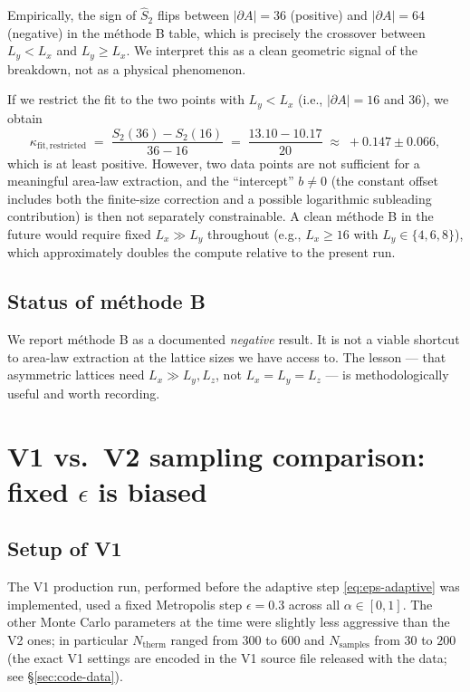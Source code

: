 \documentclass[11pt,a4paper]{article}
\theoremstyle{definition}
\begin{document}
Empirically, the sign of $\widehat S_2$ flips between
$|\partial A| = 36$ (positive) and $|\partial A| = 64$ (negative)
in the méthode B table, which is precisely the crossover between
$L_y < L_x$ and $L_y \ge L_x$. We interpret this as a clean
geometric signal of the breakdown, not as a physical phenomenon.

If we restrict the fit to the two points with $L_y < L_x$ (i.e.,
$|\partial A| = 16$ and $36$), we obtain
\begin{equation}
   \kappa_{\mathrm{fit,restricted}} \;=\;
   \frac{S_2(36) - S_2(16)}{36 - 16} \;=\; \frac{13.10 - 10.17}{20}
   \;\approx\; +0.147 \pm 0.066,
\end{equation}
which is at least positive. However, two data points are not
sufficient for a meaningful area-law extraction, and the
``intercept'' $b \neq 0$ (the constant offset includes both the
finite-size correction and a possible logarithmic subleading
contribution) is then not separately constrainable. A clean méthode
B in the future would require fixed $L_x \gg L_y$ throughout (e.g.,
$L_x \ge 16$ with $L_y \in \{4, 6, 8\}$), which approximately
doubles the compute relative to the present run.

\subsection{Status of méthode B}

We report méthode B as a documented \emph{negative} result. It is
not a viable shortcut to area-law extraction at the lattice sizes
we have access to. The lesson --- that asymmetric lattices need
$L_x \gg L_y, L_z$, not $L_x = L_y = L_z$ --- is methodologically
useful and worth recording.

\section{V1 vs.\ V2 sampling comparison: fixed
         \texorpdfstring{$\epsilon$}{eps} is biased}
\label{app:v1-vs-v2}

\subsection{Setup of V1}

The V1 production run, performed before the adaptive step
\eqref{eq:eps-adaptive} was implemented, used a fixed Metropolis
step $\epsilon = 0.3$ across all $\alpha \in [0, 1]$. The other
Monte Carlo parameters at the time were slightly less aggressive
than the V2 ones; in particular $N_{\mathrm{therm}}$ ranged from
$300$ to $600$ and $N_{\mathrm{samples}}$ from $30$ to $200$ (the
exact V1 settings are encoded in the V1 source file released with
the data; see \S\ref{sec:code-data}).
\end{document}
